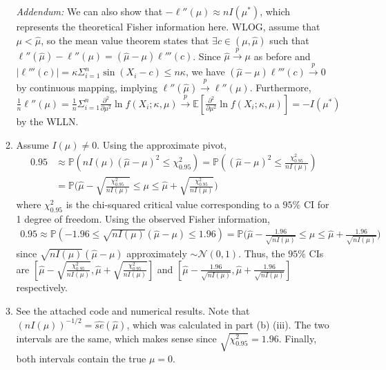 \documentclass[12pt]{article}
\newcommand{\E}{\mathbb{E}}
\newcommand{\p}{\mathbb{P}}
\newcommand{\h}[1]{\hat{#1}}
\begin{document}
\begin{enumerate}
\begin{enumerate}
        \textit{Addendum:} We can also show that $-\ell''(\mu) \approx nI(\mu^*)$, which represents the theoretical Fisher information here. WLOG, assume that $\mu<\h\mu$, so the mean value theorem states that $\exists c \in (\mu, \h\mu)$ such that $\ell''(\h\mu)-\ell''(\mu) = (\h\mu-\mu)\ell'''(c)$. Since $\h\mu \overset{p}{\to} \mu$ as before and $|\ell'''(c)| = \kappa\Sigma_{i=1}^n \sin(X_i-c) \leq n\kappa$, we have $(\h\mu-\mu)\ell'''(c) \overset{p}{\to} 0$ by continuous mapping, implying $\ell''(\h\mu) \overset{p}{\to} \ell''(\mu)$. Furthermore, $\frac{1}{n}\ell''(\mu) = \frac{1}{n}\Sigma_{i=1}^n \frac{\partial^2}{\partial\mu^2} \ln f(X_i; \kappa,\mu) \overset{p}{\to} \E[\frac{\partial^2}{\partial\mu^2} \ln f(X_i; \kappa,\mu)] = -I(\mu^*)$ by the WLLN.
        \item Assume $I(\mu) \neq 0$. Using the approximate pivot, \begin{align*}
            0.95 &\approx \p(nI(\mu)(\h\mu - \mu)^2 \leq \chi^2_{0.95}) = \p((\h\mu - \mu)^2 \leq \frac{\chi^2_{0.95}}{nI(\mu)})\\
            &= \p\Big(\h\mu - \sqrt{\frac{\chi^2_{0.95}}{nI(\mu)}} \leq \mu \leq \h\mu + \sqrt{\frac{\chi^2_{0.95}}{nI(\mu)}}\Big)
        \end{align*} where $\chi^2_{0.95}$ is the chi-squared critical value corresponding to a $95\%$ CI for 1 degree of freedom. Using the observed Fisher information, \begin{align*}
            0.95 \approx \p(-1.96 \leq \sqrt{nI(\mu)}(\h\mu-\mu) \leq 1.96) = \p\Big(\h\mu - \frac{1.96}{\sqrt{nI(\mu)}} \leq \mu \leq \h\mu + \frac{1.96}{\sqrt{nI(\mu)}}\Big)
        \end{align*} since $\sqrt{nI(\mu)}(\h\mu-\mu)$ approximately $\sim \mathcal{N}(0,1)$. Thus, the $95\%$ CIs are $[\h\mu - \sqrt{\frac{\chi^2_{0.95}}{nI(\mu)}}, \h\mu + \sqrt{\frac{\chi^2_{0.95}}{nI(\mu)}}]$ and $[\h\mu - \frac{1.96}{\sqrt{nI(\mu)}}, \h\mu + \frac{1.96}{\sqrt{nI(\mu)}}]$ respectively.
        \item See the attached code and numerical results. Note that $(nI(\mu))^{-1/2} = \widehat{se}(\h\mu)$, which was calculated in part (b) (iii). The two intervals are the same, which makes sense since $\sqrt{\chi^2_{0.95}} = 1.96$. Finally, both intervals contain the true $\mu = 0$.
    \end{enumerate}
\end{enumerate}
\end{document}
